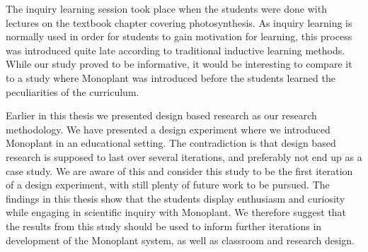 The inquiry learning session took place when the students were done with lectures on the textbook chapter covering photosynthesis. As inquiry learning is normally used in order for students to gain motivation for learning, this process was introduced quite late according to traditional inductive learning methods. While our study proved to be informative, it would be interesting to compare it to a study where Monoplant was introduced before the students learned the peculiarities of the curriculum.

Earlier in this thesis we presented design based research as our research methodology. We have presented a design experiment where we introduced Monoplant in an educational setting. The contradiction is that design based research is supposed to last over several iterations, and preferably not end up as a case study. We are aware of this and consider this study to be the first iteration of a design experiment, with still plenty of future work to be pursued. The findings in this thesis show that the students display enthusiasm and curiosity while engaging in scientific inquiry with Monoplant. We therefore suggest that the results from this study should be used to inform further iterations in development of the Monoplant system, as well as classroom and research design.